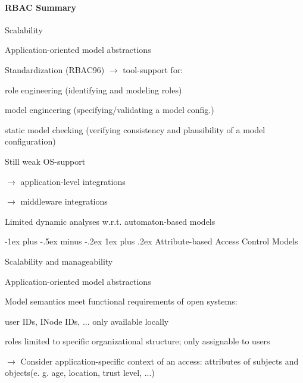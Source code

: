 \documentclass[a4paper]{article}
\makeatletter
\renewcommand{\subsubsection}{\@startsection{subsubsection}{3}{0mm}%
                                {-1ex plus -.5ex minus -.2ex}%
                                {1ex plus .2ex}%
                                {\normalfont\small\bfseries}}
\makeatother
\begin{document}
\begin{multicols}{3}
    \paragraph{RBAC Summary}
    \begin{itemize*}
        \item Scalability
        \item Application-oriented model abstractions
        \item Standardization (RBAC96) $\rightarrow$ tool-support for:
        \begin{itemize*}
            \item role engineering (identifying and modeling roles)
            \item model engineering (specifying/validating a model config.)
            \item static model checking (verifying consistency and plausibility of a model configuration)
        \end{itemize*}
        \item Still weak OS-support
        \begin{itemize*}
            \item $\rightarrow$ application-level integrations
            \item $\rightarrow$ middleware integrations
        \end{itemize*}
        \item Limited dynamic analyses w.r.t. automaton-based models
    \end{itemize*}

    \subsubsection{Attribute-based Access Control Models}
    \begin{itemize*}
        \item Scalability and manageability
        \item Application-oriented model abstractions
        \item Model semantics meet functional requirements of open systems:
        \begin{itemize*}
            \item user IDs, INode IDs, ... only available locally
            \item roles limited to specific organizational structure; only assignable to users
        \end{itemize*}
        \item $\rightarrow$ Consider application-specific context of an access: attributes of subjects and objects(e. g. age, location, trust level, ...)
    \end{itemize*}


\end{multicols}
\end{document}
